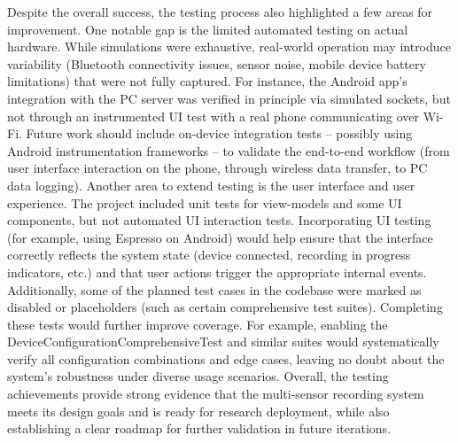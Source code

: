 Despite the overall success, the testing process also highlighted a few areas for improvement. One notable gap is the limited automated testing on actual hardware. While simulations were exhaustive, real-world operation may introduce variability (Bluetooth connectivity issues, sensor noise, mobile device battery limitations) that were not fully captured. For instance, the Android app's integration with the PC server was verified in principle via simulated sockets, but not through an instrumented UI test with a real phone communicating over Wi-Fi. Future work should include on-device integration tests – possibly using Android instrumentation frameworks – to validate the end-to-end workflow (from user interface interaction on the phone, through wireless data transfer, to PC data logging). Another area to extend testing is the user interface and user experience. The project included unit tests for view-models and some UI components, but not automated UI interaction tests. Incorporating UI testing (for example, using Espresso on Android) would help ensure that the interface correctly reflects the system state (device connected, recording in progress indicators, etc.) and that user actions trigger the appropriate internal events. Additionally, some of the planned test cases in the codebase were marked as disabled or placeholders (such as certain comprehensive test suites). Completing these tests would further improve coverage. For example, enabling the DeviceConfigurationComprehensiveTest and similar suites would systematically verify all configuration combinations and edge cases, leaving no doubt about the system's robustness under diverse usage scenarios. Overall, the testing achievements provide strong evidence that the multi-sensor recording system meets its design goals and is ready for research deployment, while also establishing a clear roadmap for further validation in future iterations.